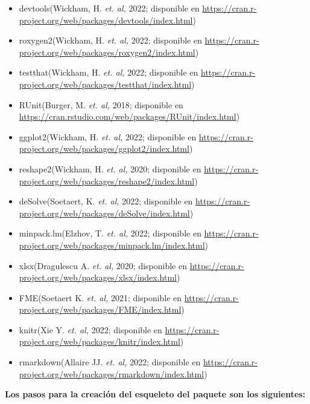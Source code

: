 \begin{itemize}
    \item devtools(Wickham, H. \textit{et. al,} 2022; disponible en \url{https://cran.r-project.org/web/packages/devtools/index.html})
    \item roxygen2(Wickham, H. \textit{et. al,} 2022; disponible en \url{https://cran.r-project.org/web/packages/roxygen2/index.html})
    \item testthat(Wickham, H. \textit{et. al,} 2022; disponible en \url{https://cran.r-project.org/web/packages/testthat/index.html})
    \item RUnit(Burger, M. \textit{et. al,} 2018; disponible en \url{https://cran.rstudio.com/web/packages/RUnit/index.html})
    \item ggplot2(Wickham, H. \textit{et. al,} 2022; disponible en \url{https://cran.r-project.org/web/packages/ggplot2/index.html})
    \item reshape2(Wickham, H. \textit{et. al,} 2020; disponible en \url{https://cran.r-project.org/web/packages/reshape2/index.html})
    \item deSolve(Soetaert, K. \textit{et. al,} 2022; disponible en \url{https://cran.r-project.org/web/packages/deSolve/index.html})
    \item minpack.lm(Elzhov, T. \textit{et. al,} 2022; disponible en \url{https://cran.r-project.org/web/packages/minpack.lm/index.html})
    \item xlsx(Dragulescu A. \textit{et. al,} 2020; disponible en \url{https://cran.r-project.org/web/packages/xlsx/index.html})
    \item FME(Soetaert K. \textit{et. al,} 2021; disponible en \url{https://cran.r-project.org/web/packages/FME/index.html})
    \item knitr(Xie Y. \textit{et. al,} 2022; disponible en \url{https://cran.r-project.org/web/packages/knitr/index.html})
    \item rmarkdown(Allaire JJ. \textit{et. al,} 2022; disponible en \url{https://cran.r-project.org/web/packages/rmarkdown/index.html})
\end{itemize}

\noindent
\textbf{Los pasos para la creación del esqueleto del paquete son los siguientes:\\}

